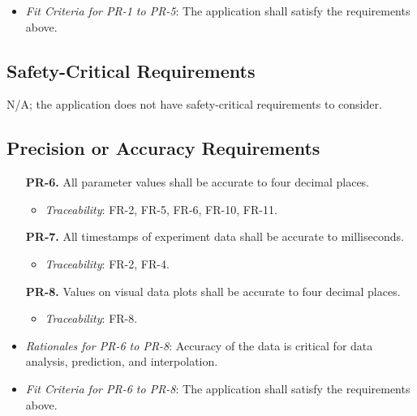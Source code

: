 \documentclass[12pt]{article}
\begin{document}
\begin{itemize}
  \item \textit{Fit Criteria for PR-1 to PR-5}: The application shall satisfy the requirements above.
\end{itemize}

\subsection{Safety-Critical Requirements}
N/A; the application does not have safety-critical requirements to consider.

\subsection{Precision or Accuracy Requirements}
\begin{enumerate}
  \item[\textbf{PR-6.}] All parameter values shall be accurate to four decimal places.
    \begin{itemize}
      \item \textit{Traceability}: FR-2, FR-5, FR-6, FR-10, FR-11.
    \end{itemize}
  \item[\textbf{PR-7.}] All timestamps of experiment data shall be accurate to milliseconds.
    \begin{itemize}
      \item \textit{Traceability}: FR-2, FR-4.
    \end{itemize}
  \item[\textbf{PR-8.}] Values on visual data plots shall be accurate to four decimal places.
    \begin{itemize}
        \item \textit{Traceability}: FR-8.
    \end{itemize}
\end{enumerate}
\begin{itemize}
  \item \textit{Rationales for PR-6 to PR-8}: Accuracy of the data is critical for data analysis, prediction, and interpolation.
  \item \textit{Fit Criteria for PR-6 to PR-8}: The application shall satisfy the requirements above.
\end{itemize}
\end{document}
